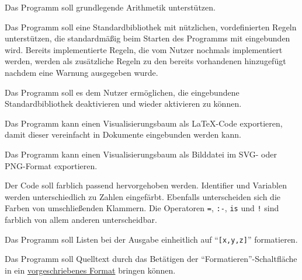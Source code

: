 \documentclass[parskip=full,11pt,twoside]{scrartcl}
\begin{document}

Das Programm soll grundlegende Arithmetik unterstützen.


Das Programm soll eine Standardbibliothek mit nützlichen, vordefinierten Regeln unterstützen, die standardmäßig beim Starten des Programms mit eingebunden wird. Bereits implementierte Regeln, die vom Nutzer nochmals implementiert werden, werden als zusätzliche Regeln zu den bereits vorhandenen hinzugefügt nachdem eine Warnung ausgegeben wurde.


Das Programm soll es dem Nutzer ermöglichen, die eingebundene Standardbibliothek deaktivieren und wieder aktivieren zu können.


Das Programm kann einen Visualisierungsbaum als LaTeX-Code exportieren, damit dieser vereinfacht in Dokumente eingebunden werden kann.


Das Programm kann einen Visualisierungsbaum als Bilddatei im SVG- oder PNG-Format exportieren.


Der Code soll farblich passend hervorgehoben werden. Identifier und Variablen werden unterschiedlich zu Zahlen eingefärbt. Ebenfalls unterscheiden sich die Farben von umschließenden Klammern. Die Operatoren \texttt{=}, \texttt{:-}, \texttt{is} und \texttt{!} sind farblich von allem anderen unterscheidbar.


Das Programm soll Listen bei der Ausgabe einheitlich auf \enquote{\texttt{[x,y,z]}} formatieren.


Das Programm soll Quelltext durch das Betätigen der \enquote{Formatieren}-Schaltfläche in ein \hyperref[format]{vorgeschriebenes Format} bringen können.

\end{document}
